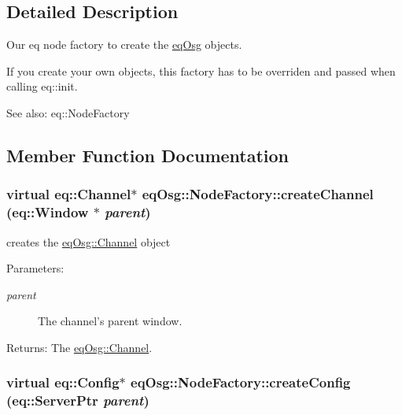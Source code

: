 \subsection{Detailed Description}
Our eq node factory to create the \hyperlink{a00045}{eqOsg} objects. 

If you create your own objects, this factory has to be overriden and passed when calling eq::init. \begin{Desc}
\item[See also:]eq::NodeFactory \end{Desc}


\subsection{Member Function Documentation}
\hypertarget{a00013_9cd8a51ad40a04fae74c86d20c5ad561}{
\subsubsection[{createChannel}]{\setlength{\rightskip}{0pt plus 5cm}virtual eq::Channel$\ast$ eqOsg::NodeFactory::createChannel (eq::Window $\ast$ {\em parent})}}
\label{a00013_9cd8a51ad40a04fae74c86d20c5ad561}


creates the \hyperlink{a00002}{eqOsg::Channel} object 

\begin{Desc}
\item[Parameters:]
\begin{description}
\item[{\em parent}]The channel's parent window. \end{description}
\end{Desc}
\begin{Desc}
\item[Returns:]The \hyperlink{a00002}{eqOsg::Channel}. \end{Desc}
\hypertarget{a00013_0e80614084de6b23a4a2677fc8af7f93}{
\subsubsection[{createConfig}]{\setlength{\rightskip}{0pt plus 5cm}virtual eq::Config$\ast$ eqOsg::NodeFactory::createConfig (eq::ServerPtr {\em parent})}}
\label{a00013_0e80614084de6b23a4a2677fc8af7f93}


